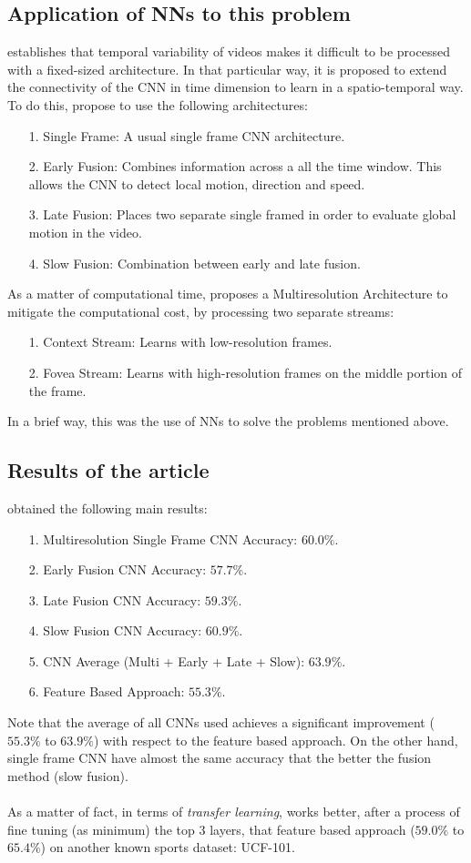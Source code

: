 \documentclass[12pt]{article}
\theoremstyle{plain}
\theoremstyle{definition}
\theoremstyle{definition}
\theoremstyle{definition}
\begin{document}
\subsection*{Application of NNs to this problem}
\noindent \cite{6909619} establishes that temporal variability of videos makes it difficult to be processed with a fixed-sized architecture. In that particular way, it is proposed to extend the connectivity of the CNN in
time dimension to learn in a spatio-temporal way. To do this, \cite{6909619} propose to use the following architectures:
\begin{itemize}
    \item[1.] Single Frame: A usual single frame CNN architecture. 
    \item[2.] Early Fusion: Combines information across a all the time window. This allows the CNN to detect local motion, direction and speed.
    \item[3.] Late Fusion: Places two separate single framed in order to evaluate global motion in the video. \item[4.] Slow Fusion: Combination between early and late fusion. 
\end{itemize}
As a matter of computational time, \cite{6909619} proposes a Multiresolution Architecture to mitigate the computational cost, by processing two separate streams:
\begin{itemize}
    \item[1.] Context Stream: Learns with low-resolution frames.
    \item[2.] Fovea Stream: Learns with high-resolution frames  on the middle portion of the frame.
\end{itemize}
In a brief way, this was the use of NNs to solve the problems mentioned above. 
\subsection*{Results of the article}
\noindent \cite{6909619} obtained the following main results:
\begin{itemize}
    \item[1.] Multiresolution Single Frame CNN Accuracy: $60.0\%$.
    \item[2.] Early Fusion CNN Accuracy: $57.7\%$.
    \item[3.] Late Fusion CNN Accuracy: $59.3\%$.
    \item[4.] Slow Fusion CNN Accuracy: $60.9\%$.
    \item[5.] CNN Average (Multi + Early + Late + Slow): $63.9\%$.
    \item[6.] Feature Based Approach: $55.3\%$.
\end{itemize}
Note that the average of all CNNs used achieves a significant improvement ($55.3\%$ to $63.9\%$) with respect to the feature based approach. On the other hand, single frame CNN have almost the same accuracy that the better the fusion method (slow fusion).\\
\\ As a matter of fact, in terms of \textit{transfer learning}, works better, after a process of fine tuning (as minimum) the top $3$ layers, that feature based approach ($59.0\%$ to $65.4\%$) on another known sports dataset: UCF-101.
\end{document}
